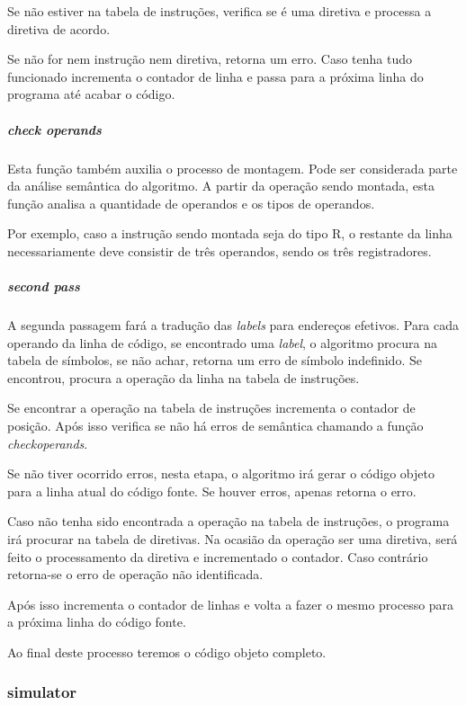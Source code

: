 				Se não estiver na tabela de instruções, verifica se é uma diretiva e processa a diretiva de acordo.

				Se não for nem instrução nem diretiva, retorna um erro. Caso tenha tudo funcionado incrementa o contador de linha e passa para a próxima linha do programa até acabar o código.

			\subparagraph{check operands}

				Esta função também auxilia o processo de montagem. Pode ser considerada parte da análise semântica do algoritmo. A partir da operação sendo montada, esta função analisa a quantidade de operandos e os tipos de operandos. 

				Por exemplo, caso a instrução sendo montada seja do tipo R, o restante da linha necessariamente deve consistir de três operandos, sendo os três registradores. 

			\subparagraph{second pass}
			
				A segunda passagem fará a tradução das \textit{labels} para endereços efetivos. Para cada operando da linha de código, se encontrado uma \textit{label}, o algoritmo procura na tabela de símbolos, se não achar, retorna um erro de símbolo indefinido. Se encontrou, procura a operação da linha na tabela de instruções.

				Se encontrar a operação na tabela de instruções incrementa o contador de posição. Após isso verifica se não há erros de semântica chamando a função \textit{check\textunderscore operands}.

				Se não tiver ocorrido erros, nesta etapa, o algoritmo irá gerar o código objeto para a linha atual do código fonte. Se houver erros, apenas retorna o erro.

				Caso não tenha sido encontrada a operação na tabela de instruções, o programa irá procurar na tabela de diretivas. Na ocasião da operação ser uma diretiva, será feito o processamento da diretiva e incrementado o contador. Caso contrário retorna-se o erro de operação não identificada.

				Após isso incrementa o contador de linhas e volta a fazer o mesmo processo para a próxima linha do código fonte.

				Ao final deste processo teremos o código objeto completo.
			
		\subsubsection{simulator}

